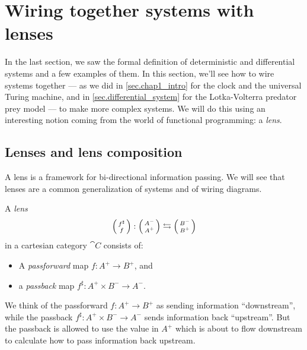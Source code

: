 \documentclass[DynamicalBook]{subfiles}
\begin{document}
\section{Wiring together systems with lenses}\label{sec.wiring_discrete_systems}

In the last section, we saw the formal definition of deterministic and
differential systems and a
few examples of them. In this section, we'll see how to wire systems
together --- as we did in \cref{sec.chap1_intro} for the clock and the universal
Turing machine, and in \cref{sec.differential_system} for the Lotka-Volterra
predator prey model --- to
make more complex systems. We will do this using an interesting notion coming
from the world of functional programming: a \emph{lens}.

\subsection{Lenses and lens composition}\label{sec.lens_discrete}

A lens is a framework for bi-directional information passing. We will see that lenses are a common generalization of systems and of wiring diagrams.
\begin{definition}\label{def.lens}
  A \emph{lens}
\[
\lens{f^{\sharp}}{f} : \lens{A^-}{A^+} \leftrightarrows
\lens{B^-}{B^+}
\]
in a cartesian category $\cat{C}$ consists of:
  \begin{itemize}
  \item A \emph{passforward} map $f : A^+ \to B^+$, and
    \item a \emph{passback} map $f^{\sharp} : A^+ \times B^- \to A^-$.
  \end{itemize}
\end{definition}

We think of the passforward $f : A^{+} \to B^{+}$ as sending information ``downstream'', while the passback $f^{{\sharp}} : A^{+} \times B^{-} \to A^{-}$ sends information back ``upstream''. But the passback is allowed to use the value in $A^{+}$ which is about to flow downstream to calculate how to pass information back upstream.
\end{document}
